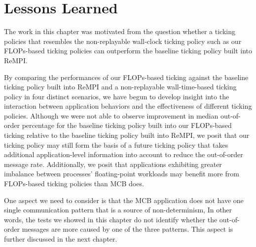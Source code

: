 \section{Lessons Learned}

The work in this chapter was motivated from the question whether a
ticking policies that resembles the non-replayable wall-clock ticking
policy such as our FLOPs-based ticking policies can outperform the
baseline ticking policy built into ReMPI. 

By comparing the performances of our 
FLOPs-based ticking against the baseline ticking policy built into
ReMPI and a non-replayable wall-time-based ticking policy in four
distinct scenarios, we have begun to develop insight into the
interaction between application behaviors and the effectiveness of
different ticking policies. Although we were not able to observe
improvement in median out-of-order percentage for the baseline
ticking policy built into our FLOPs-based ticking relative to the
baseline ticking policy built into ReMPI, we posit that our ticking
policy may still form the basis of a future ticking policy that takes
additional application-level information into account to reduce the
out-of-order message rate. Additionally, we posit that applications
exhibiting greater imbalance between processes' floating-point
workloads may benefit more from FLOPs-based ticking policies than MCB
does. 

One aspect we need to consider is that the MCB application does not
have one single communication pattern that is a source of
non-determinism, In other words, the tests we showed in this chapter
do not identify whether the out-of-order messages are more caused by one
of the three patterns. This aspect is further discussed in the next
chapter.

